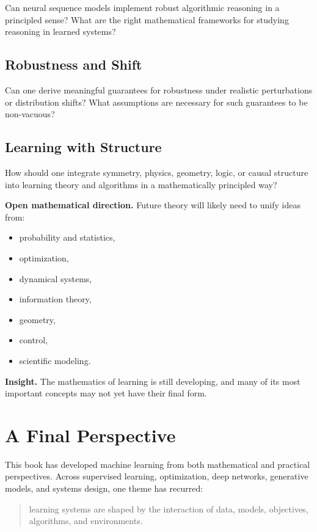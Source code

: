 Can neural sequence models implement robust algorithmic reasoning in a principled sense? What are the right mathematical frameworks for studying reasoning in learned systems?

\subsection{Robustness and Shift}

Can one derive meaningful guarantees for robustness under realistic perturbations or distribution shifts? What assumptions are necessary for such guarantees to be non-vacuous?

\subsection{Learning with Structure}

How should one integrate symmetry, physics, geometry, logic, or causal structure into learning theory and algorithms in a mathematically principled way?

\medskip

\noindent
\textbf{Open mathematical direction.}
Future theory will likely need to unify ideas from:
\begin{itemize}
    \item probability and statistics,
    \item optimization,
    \item dynamical systems,
    \item information theory,
    \item geometry,
    \item control,
    \item scientific modeling.
\end{itemize}

\medskip

\noindent
\textbf{Insight.}
The mathematics of learning is still developing, and many of its most important concepts may not yet have their final form.

\section{A Final Perspective}

This book has developed machine learning from both mathematical and practical perspectives. Across supervised learning, optimization, deep networks, generative models, and systems design, one theme has recurred:

\begin{quote}
learning systems are shaped by the interaction of data, models, objectives, algorithms, and environments.
\end{quote}

